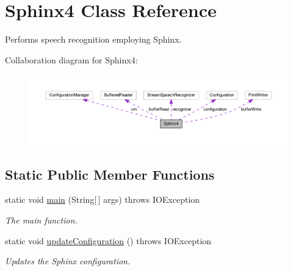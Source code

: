 \hypertarget{classSphinx4}{\section{Sphinx4 Class Reference}
\label{classSphinx4}
}


Performs speech recognition employing Sphinx.  




Collaboration diagram for Sphinx4\-:
\nopagebreak
\begin{figure}[H]
\begin{center}
\leavevmode
\includegraphics[width=350pt]{classSphinx4__coll__graph}
\end{center}
\end{figure}
\subsection*{Static Public Member Functions}
\begin{DoxyCompactItemize}
\item 
static void \hyperlink{classSphinx4_aef64fe2e07f6ae4013fc64112ccedd17}{main} (String\mbox{[}$\,$\mbox{]} args)  throws I\-O\-Exception 
\begin{DoxyCompactList}\small\item\em The main function. \end{DoxyCompactList}\item 
static void \hyperlink{classSphinx4_aba08f44441901e354030366cd6f431e9}{update\-Configuration} ()  throws I\-O\-Exception
\begin{DoxyCompactList}\small\item\em Updates the Sphinx configuration. \end{DoxyCompactList}\end{DoxyCompactItemize}
